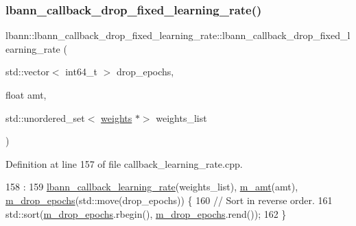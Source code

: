 \subsubsection{\texorpdfstring{lbann\+\_\+callback\+\_\+drop\+\_\+fixed\+\_\+learning\+\_\+rate()}{lbann\_callback\_drop\_fixed\_learning\_rate()}\hspace{0.1cm}{\footnotesize\ttfamily [2/3]}}
{\footnotesize\ttfamily lbann\+::lbann\+\_\+callback\+\_\+drop\+\_\+fixed\+\_\+learning\+\_\+rate\+::lbann\+\_\+callback\+\_\+drop\+\_\+fixed\+\_\+learning\+\_\+rate (\begin{DoxyParamCaption}\item[{std\+::vector$<$ int64\+\_\+t $>$}]{drop\+\_\+epochs,  }\item[{float}]{amt,  }\item[{std\+::unordered\+\_\+set$<$ \hyperlink{classlbann_1_1weights}{weights} $\ast$$>$}]{weights\+\_\+list }\end{DoxyParamCaption})}



Definition at line 157 of file callback\+\_\+learning\+\_\+rate.\+cpp.


\begin{DoxyCode}
158                                                                                        :
159   \hyperlink{classlbann_1_1lbann__callback__learning__rate_a69687cd55f4d09c480e08e18488519fe}{lbann\_callback\_learning\_rate}(weights\_list), \hyperlink{classlbann_1_1lbann__callback__drop__fixed__learning__rate_a3e38dc2b7dc92d29567091395de22546}{m\_amt}(amt), 
      \hyperlink{classlbann_1_1lbann__callback__drop__fixed__learning__rate_afc99419c3d818fe86d5865c8f7beae49}{m\_drop\_epochs}(std::move(drop\_epochs)) \{
160   \textcolor{comment}{// Sort in reverse order.}
161   std::sort(\hyperlink{classlbann_1_1lbann__callback__drop__fixed__learning__rate_afc99419c3d818fe86d5865c8f7beae49}{m\_drop\_epochs}.rbegin(), \hyperlink{classlbann_1_1lbann__callback__drop__fixed__learning__rate_afc99419c3d818fe86d5865c8f7beae49}{m\_drop\_epochs}.rend());
162 \}
\end{DoxyCode}
\mbox{\label{classlbann_1_1lbann__callback__drop__fixed__learning__rate_a5bb3a2e1d490d128e27dd1df2503644d}} 
